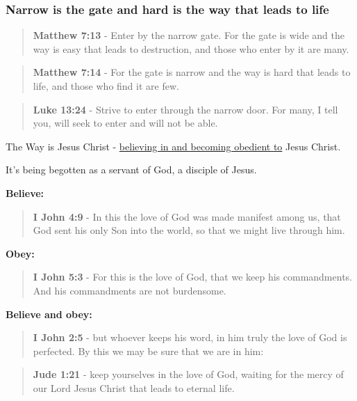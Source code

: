 \documentclass[11pt]{article}
\begin{document}
\subsubsection{Narrow is the gate and hard is the way that leads to life}
\label{sec:org4bf5a95}
\begin{quote}
\textbf{Matthew 7:13} - Enter by the narrow gate. For the gate is wide and the way is easy that leads to destruction, and those who enter by it are many.
\end{quote}

\begin{quote}
\textbf{Matthew 7:14} - For the gate is narrow and the way is hard that leads to life, and those who find it are few.
\end{quote}

\begin{quote}
\textbf{Luke 13:24} - Strive to enter through the narrow door. For many, I tell you, will seek to enter and will not be able.
\end{quote}

The Way is Jesus Christ - \uline{believing in and becoming obedient to} Jesus Christ.

It's being begotten as a servant of God, a disciple of Jesus.

\textbf{Believe:}

\begin{quote}
\textbf{I John 4:9} - In this the love of God was made manifest among us, that God sent his only Son into the world, so that we might live through him.
\end{quote}

\textbf{Obey:}

\begin{quote}
\textbf{I John 5:3} - For this is the love of God, that we keep his commandments. And his commandments are not burdensome.
\end{quote}

\textbf{Believe and obey:}

\begin{quote}
\textbf{I John 2:5} - but whoever keeps his word, in him truly the love of God is perfected. By this we may be sure that we are in him:
\end{quote}

\begin{quote}
\textbf{Jude 1:21} - keep yourselves in the love of God, waiting for the mercy of our Lord Jesus Christ that leads to eternal life.
\end{quote}
\end{document}
